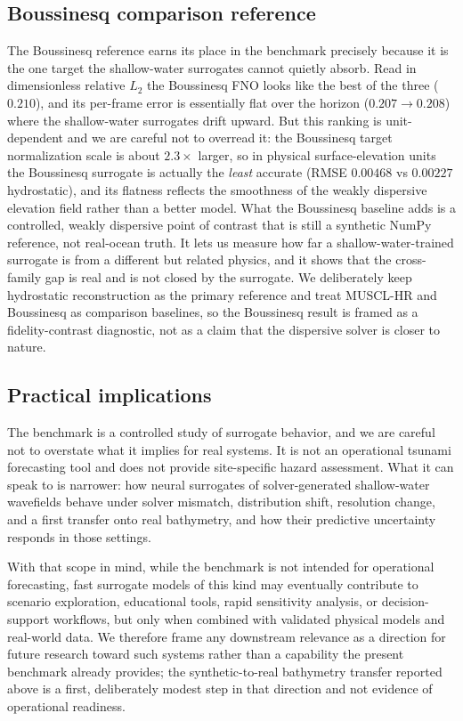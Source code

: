 \subsection{Boussinesq comparison reference}
The Boussinesq reference earns its place in the benchmark precisely because it is the one target the shallow-water surrogates cannot quietly absorb. Read in dimensionless relative $L_2$ the Boussinesq FNO looks like the best of the three ($0.210$), and its per-frame error is essentially flat over the horizon ($0.207 \to 0.208$) where the shallow-water surrogates drift upward. But this ranking is unit-dependent and we are careful not to overread it: the Boussinesq target normalization scale is about $2.3 \times$ larger, so in physical surface-elevation units the Boussinesq surrogate is actually the \emph{least} accurate (RMSE $0.00468$ vs $0.00227$ hydrostatic), and its flatness reflects the smoothness of the weakly dispersive elevation field rather than a better model. What the Boussinesq baseline adds is a controlled, weakly dispersive point of contrast that is still a synthetic NumPy reference, not real-ocean truth. It lets us measure how far a shallow-water-trained surrogate is from a different but related physics, and it shows that the cross-family gap is real and is not closed by the surrogate. We deliberately keep hydrostatic reconstruction as the primary reference and treat MUSCL-HR and Boussinesq as comparison baselines, so the Boussinesq result is framed as a fidelity-contrast diagnostic, not as a claim that the dispersive solver is closer to nature.

\subsection{Practical implications}
The benchmark is a controlled study of surrogate behavior, and we are careful not to overstate what it implies for real systems. It is not an operational tsunami forecasting tool and does not provide site-specific hazard assessment. What it can speak to is narrower: how neural surrogates of solver-generated shallow-water wavefields behave under solver mismatch, distribution shift, resolution change, and a first transfer onto real bathymetry, and how their predictive uncertainty responds in those settings.

With that scope in mind, while the benchmark is not intended for operational forecasting, fast surrogate models of this kind may eventually contribute to scenario exploration, educational tools, rapid sensitivity analysis, or decision-support workflows, but only when combined with validated physical models and real-world data. We therefore frame any downstream relevance as a direction for future research toward such systems rather than a capability the present benchmark already provides; the synthetic-to-real bathymetry transfer reported above is a first, deliberately modest step in that direction and not evidence of operational readiness.
